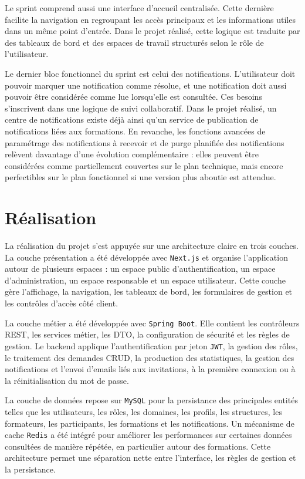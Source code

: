 \documentclass[12pt,a4paper]{report}
\begin{document}
Le sprint comprend aussi une interface d'accueil centralisée. Cette dernière facilite la navigation en regroupant les accès principaux et les informations utiles dans un même point d'entrée. Dans le projet réalisé, cette logique est traduite par des tableaux de bord et des espaces de travail structurés selon le rôle de l'utilisateur.

Le dernier bloc fonctionnel du sprint est celui des notifications. L'utilisateur doit pouvoir marquer une notification comme résolue, et une notification doit aussi pouvoir être considérée comme lue lorsqu'elle est consultée. Ces besoins s'inscrivent dans une logique de suivi collaboratif. Dans le projet réalisé, un centre de notifications existe déjà ainsi qu'un service de publication de notifications liées aux formations. En revanche, les fonctions avancées de paramétrage des notifications à recevoir et de purge planifiée des notifications relèvent davantage d'une évolution complémentaire : elles peuvent être considérées comme partiellement couvertes sur le plan technique, mais encore perfectibles sur le plan fonctionnel si une version plus aboutie est attendue.

\section{Réalisation}
La réalisation du projet s'est appuyée sur une architecture claire en trois couches. La couche présentation a été développée avec \texttt{Next.js} et organise l'application autour de plusieurs espaces : un espace public d'authentification, un espace d'administration, un espace responsable et un espace utilisateur. Cette couche gère l'affichage, la navigation, les tableaux de bord, les formulaires de gestion et les contrôles d'accès côté client.

La couche métier a été développée avec \texttt{Spring Boot}. Elle contient les contrôleurs REST, les services métier, les DTO, la configuration de sécurité et les règles de gestion. Le backend applique l'authentification par jeton \texttt{JWT}, la gestion des rôles, le traitement des demandes CRUD, la production des statistiques, la gestion des notifications et l'envoi d'emails liés aux invitations, à la première connexion ou à la réinitialisation du mot de passe.

La couche de données repose sur \texttt{MySQL} pour la persistance des principales entités telles que les utilisateurs, les rôles, les domaines, les profils, les structures, les formateurs, les participants, les formations et les notifications. Un mécanisme de cache \texttt{Redis} a été intégré pour améliorer les performances sur certaines données consultées de manière répétée, en particulier autour des formations. Cette architecture permet une séparation nette entre l'interface, les règles de gestion et la persistance.
\end{document}
